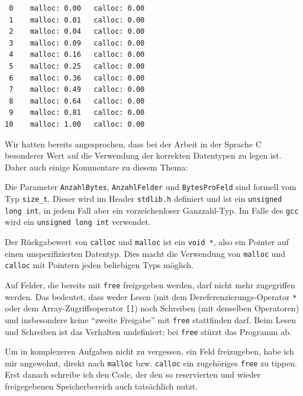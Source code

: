 \begin{cmdbox}
\begin{verbatim}
 0    malloc: 0.00   calloc: 0.00
 1    malloc: 0.01   calloc: 0.00
 2    malloc: 0.04   calloc: 0.00
 3    malloc: 0.09   calloc: 0.00
 4    malloc: 0.16   calloc: 0.00
 5    malloc: 0.25   calloc: 0.00
 6    malloc: 0.36   calloc: 0.00
 7    malloc: 0.49   calloc: 0.00
 8    malloc: 0.64   calloc: 0.00
 9    malloc: 0.81   calloc: 0.00
10    malloc: 1.00   calloc: 0.00
\end{verbatim}
\end{cmdbox}

\begin{hintbox}
Wir hatten bereits angesprochen, dass bei der Arbeit in der Sprache C besonderer Wert auf die Verwendung der korrekten Datentypen zu legen ist. Daher auch einige Kommentare zu diesem Thema:

Die Parameter \texttt{AnzahlBytes}, \texttt{AnzahlFelder} und \texttt{BytesProFeld} sind formell vom Typ \texttt{size\_t}. Dieser wird im Header \texttt{stdlib.h} definiert und ist \idR ein \texttt{unsigned long int}, in jedem Fall aber ein vorzeichenloser Ganzzahl-Typ. Im Falle des \texttt{gcc} wird ein \texttt{unsigned long int} verwendet.

Der Rückgabewert von \texttt{calloc} und \texttt{malloc} ist ein \texttt{void *}, also ein Pointer auf einen unspezifizierten Datentyp. Dies macht die Verwendung von \texttt{malloc} und \texttt{calloc} mit Pointern jeden beliebigen Typs möglich.
\end{hintbox}

\begin{warnbox}
Auf Felder, die bereits mit \texttt{free} freigegeben werden, darf nicht mehr zugegriffen werden. Das bedeutet, dass weder Lesen (mit dem Dereferenzierungs-Operator \texttt{*} oder dem Array-Zugriffsoperator \texttt{[]}) noch Schreiben (mit denselben Operatoren) und insbesondere keine \enquote{zweite Freigabe} mit \texttt{free} stattfinden darf. Beim Lesen und Schreiben ist das Verhalten undefiniert; bei \texttt{free} stürzt das Programm ab.
\end{warnbox}

\begin{hintbox}
Um in komplexeren Aufgaben nicht zu vergessen, ein Feld freizugeben, habe ich mir angewohnt, direkt nach \texttt{malloc} bzw. \texttt{calloc} ein zugehöriges \texttt{free} zu tippen. Erst danach schreibe ich den Code, der den so reservierten und wieder freigegebenen Speicherbereich auch tatsächlich nutzt.
\end{hintbox}

